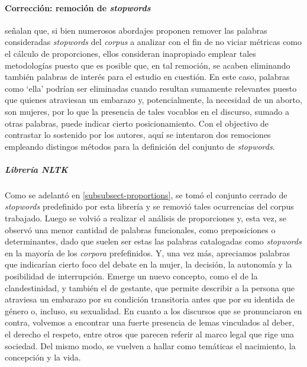 \paragraph{Corrección: remoción de \textit{stopwords}}
\cite{monroe2008fightin} señalan que, si bien numerosos abordajes proponen remover
las palabras consideradas \textit{stopwords} del \textit{corpus} a analizar con el
fin de no viciar métricas como el cálculo de proporciones, ellos consideran inapropiado
emplear tales metodologías puesto que es posible que, en tal remoción, se acaben
eliminando también palabras de interés para el estudio en cuestión. En este caso,
palabras como `ella' podrían ser eliminadas cuando resultan sumamente relevantes
puesto que quienes atraviesan un embarazo y, potencialmente, la necesidad de un
aborto, son mujeres, por lo que la presencia de tales vocablos en el discurso, sumado
a otras palabras, puede indicar cierto posicionamiento. Con el objectivo de
contrastar lo sostenido por los autores, aquí se intentaron dos remociones empleando
distingos métodos para la definición del conjunto de \textit{stopwords}.

\subparagraph{Librería NLTK}
Como se adelantó en \ref{subsubsect-proportions}, se tomó el conjunto cerrado de
\textit{stopwords} predefinido por esta librería y se removió tales ocurrencias
del corpus trabajado.
Luego se volvió a realizar el análisis de proporciones y, esta
vez, se observó una menor cantidad de palabras funcionales,
como preposiciones o determinantes, dado que suelen ser estas
las palabras catalogadas como \textit{stopwords} en la mayoría de
los \textit{corpora} prefefinidos. Y, una vez más, apreciamos palabras que indicarían
cierto foco del debate en la mujer, la decisión, la autonomía y la posibilidad de
interrupción. Emerge un nuevo concepto, como el de la clandestinidad, y también
el de gestante, que permite describir a la persona que atraviesa un embarazo por
su condición transitoria antes que por su identida de género o, incluso, su
sexualidad.
En cuanto a los discursos que se pronunciaron en contra, volvemos a
encontrar una fuerte presencia de lemas vinculados al deber, el derecho
el respeto, entre otros que parecen referir al marco legal que rige una
sociedad. Del mismo modo, se vuelven a hallar como temáticas el nacimiento,
la concepción y la vida.


